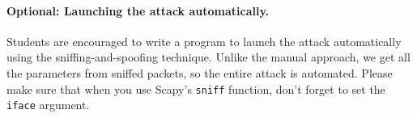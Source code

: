 \paragraph{Optional: Launching the attack automatically.} 
Students are encouraged to write a program to launch the 
attack automatically using the sniffing-and-spoofing technique. 
Unlike the manual approach, we get all the parameters
from sniffed packets, so the entire attack is automated.  
Please make sure that when you 
use Scapy's \texttt{sniff} function, don't forget to 
set the \texttt{iface} argument.  

 

\begin{comment}
%
%    

\subsection {Task 3: TCP RST Attacks on Video Streaming Applications}

Let us make the TCP RST attack more interesting by experimenting it on 
the applications that are widely used in nowadays.
We choose the video streaming application in 
this task. For this task, you can choose a video streaming web site that you 
are familiar with (we will not name any specific web site here).  Most of
video sharing websites establish a TCP connection with the client for 
streaming the video content. The attacker's goal is to disrupt the TCP session 
established between the victim and video streaming machine. To 
simplify the lab, we assume that the attacker and the victim are on the 
same LAN. In the following, we describe the common interaction between
a user (the victim) and some video-streaming web site:

\begin{itemize}
\item The victim browses for a video content in the video-streaming web 
site, and selects one of the videos for streaming. 

\item Normally video contents are hosted by a different machine,
where all the video contents are located. After the victim selects 
a video, a TCP session will be established between the victim 
machine and the content server for the video streaming.
The victim can then view the video he/she has selected.
\end{itemize}


\end{comment}
